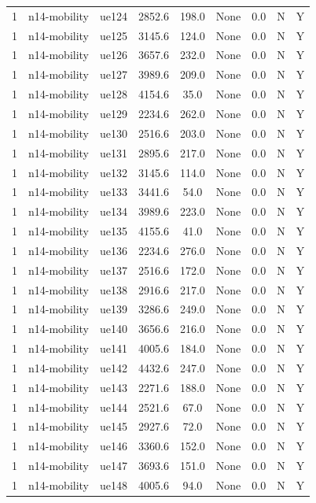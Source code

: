 \begin{table}[ht]
\begin{tabular}{|c|c|c|c|c|c|c|c|c|}
1 & n14-mobility & ue124 & 2852.6 & 198.0 & None & 0.0 & N & Y \\
1 & n14-mobility & ue125 & 3145.6 & 124.0 & None & 0.0 & N & Y \\
1 & n14-mobility & ue126 & 3657.6 & 232.0 & None & 0.0 & N & Y \\
1 & n14-mobility & ue127 & 3989.6 & 209.0 & None & 0.0 & N & Y \\
1 & n14-mobility & ue128 & 4154.6 & 35.0 & None & 0.0 & N & Y \\
1 & n14-mobility & ue129 & 2234.6 & 262.0 & None & 0.0 & N & Y \\
1 & n14-mobility & ue130 & 2516.6 & 203.0 & None & 0.0 & N & Y \\
1 & n14-mobility & ue131 & 2895.6 & 217.0 & None & 0.0 & N & Y \\
1 & n14-mobility & ue132 & 3145.6 & 114.0 & None & 0.0 & N & Y \\
1 & n14-mobility & ue133 & 3441.6 & 54.0 & None & 0.0 & N & Y \\
1 & n14-mobility & ue134 & 3989.6 & 223.0 & None & 0.0 & N & Y \\
1 & n14-mobility & ue135 & 4155.6 & 41.0 & None & 0.0 & N & Y \\
1 & n14-mobility & ue136 & 2234.6 & 276.0 & None & 0.0 & N & Y \\
1 & n14-mobility & ue137 & 2516.6 & 172.0 & None & 0.0 & N & Y \\
1 & n14-mobility & ue138 & 2916.6 & 217.0 & None & 0.0 & N & Y \\
1 & n14-mobility & ue139 & 3286.6 & 249.0 & None & 0.0 & N & Y \\
1 & n14-mobility & ue140 & 3656.6 & 216.0 & None & 0.0 & N & Y \\
1 & n14-mobility & ue141 & 4005.6 & 184.0 & None & 0.0 & N & Y \\
1 & n14-mobility & ue142 & 4432.6 & 247.0 & None & 0.0 & N & Y \\
1 & n14-mobility & ue143 & 2271.6 & 188.0 & None & 0.0 & N & Y \\
1 & n14-mobility & ue144 & 2521.6 & 67.0 & None & 0.0 & N & Y \\
1 & n14-mobility & ue145 & 2927.6 & 72.0 & None & 0.0 & N & Y \\
1 & n14-mobility & ue146 & 3360.6 & 152.0 & None & 0.0 & N & Y \\
1 & n14-mobility & ue147 & 3693.6 & 151.0 & None & 0.0 & N & Y \\
1 & n14-mobility & ue148 & 4005.6 & 94.0 & None & 0.0 & N & Y \\

\end{tabular}
\end{table}
